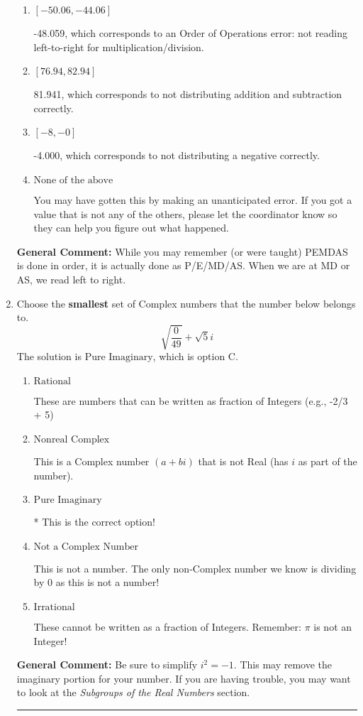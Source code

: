 \documentclass{extbook}[14pt]
\newcommand{\litem}[1]{\item #1

\rule{\textwidth}{0.4pt}}
\begin{document}
\begin{enumerate}
{\begin{enumerate}[label=\Alph*.]
* -52.800, which is the correct option.
\item \( [-50.06, -44.06] \)

 -48.059, which corresponds to an Order of Operations error: not reading left-to-right for multiplication/division.
\item \( [76.94, 82.94] \)

 81.941, which corresponds to not distributing addition and subtraction correctly.
\item \( [-8, -0] \)

 -4.000, which corresponds to not distributing a negative correctly.
\item \( \text{None of the above} \)

 You may have gotten this by making an unanticipated error. If you got a value that is not any of the others, please let the coordinator know so they can help you figure out what happened.
\end{enumerate}

\textbf{General Comment:} While you may remember (or were taught) PEMDAS is done in order, it is actually done as P/E/MD/AS. When we are at MD or AS, we read left to right.
}
\litem{
Choose the \textbf{smallest} set of Complex numbers that the number below belongs to.
\[ \sqrt{\frac{0}{49}}+\sqrt{5}i \]The solution is \( \text{Pure Imaginary} \), which is option C.\begin{enumerate}[label=\Alph*.]
\item \( \text{Rational} \)

These are numbers that can be written as fraction of Integers (e.g., -2/3 + 5)
\item \( \text{Nonreal Complex} \)

This is a Complex number $(a+bi)$ that is not Real (has $i$ as part of the number).
\item \( \text{Pure Imaginary} \)

* This is the correct option!
\item \( \text{Not a Complex Number} \)

This is not a number. The only non-Complex number we know is dividing by 0 as this is not a number!
\item \( \text{Irrational} \)

These cannot be written as a fraction of Integers. Remember: $\pi$ is not an Integer!
\end{enumerate}

\textbf{General Comment:} Be sure to simplify $i^2 = -1$. This may remove the imaginary portion for your number. If you are having trouble, you may want to look at the \textit{Subgroups of the Real Numbers} section.
}
\end{enumerate}
\end{document}

